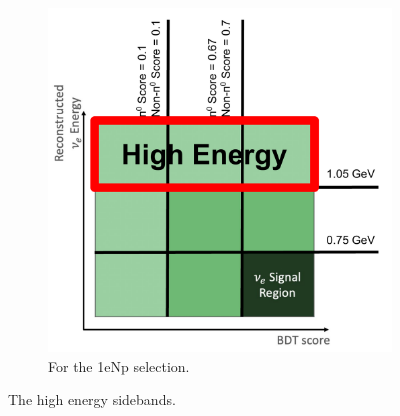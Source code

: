 \begin{figure}[H]
\begin{subfigure}{0.5\linewidth}
        \includegraphics[width=\linewidth]{technote/Sidebands/Figures/FarSideband/NpHighEnergySideband.pdf}
        \caption{For the 1eNp selection.}
    \end{subfigure}
    \caption{The high energy sidebands.}
    \label{fig:HighEnergySideband}
\end{figure}

